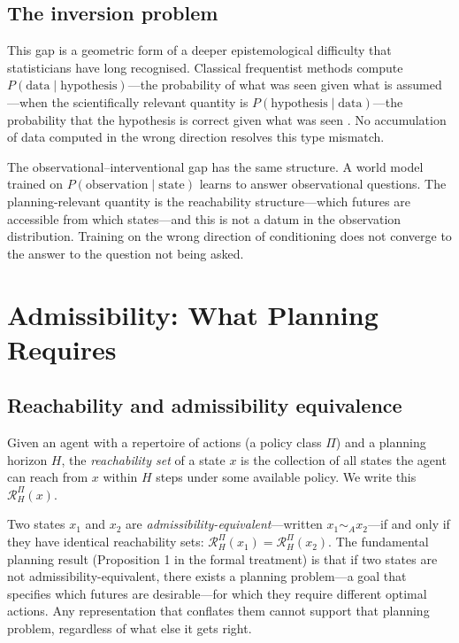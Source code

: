 \documentclass[11pt,a4paper]{article}
\newcommand{\simA}{\sim_{\!A}}
\begin{document}
\subsection{The inversion problem}

This gap is a geometric form of a deeper epistemological difficulty that
statisticians have long recognised. Classical frequentist methods compute
$P(\text{data} \mid \text{hypothesis})$---the probability of what was seen
given what is assumed---when the scientifically relevant quantity is
$P(\text{hypothesis} \mid \text{data})$---the probability that the hypothesis is
correct given what was seen \citep{jaynes2003probability}. No accumulation of
data computed in the wrong direction resolves this type mismatch.

The observational--interventional gap has the same structure. A world model
trained on $P(\text{observation} \mid \text{state})$ learns to answer
observational questions. The planning-relevant quantity is the reachability
structure---which futures are accessible from which states---and this is not
a datum in the observation distribution. Training on the wrong direction of
conditioning does not converge to the answer to the question not being asked.

\section{Admissibility: What Planning Requires}

\subsection{Reachability and admissibility equivalence}

Given an agent with a repertoire of actions (a policy class $\Pi$) and a
planning horizon $H$, the \emph{reachability set} of a state $x$ is the
collection of all states the agent can reach from $x$ within $H$ steps under
some available policy. We write this $\mathcal{R}_H^\Pi(x)$.

Two states $x_1$ and $x_2$ are \emph{admissibility-equivalent}---written
$x_1 \simA x_2$---if and only if they have identical reachability sets:
$\mathcal{R}_H^\Pi(x_1) = \mathcal{R}_H^\Pi(x_2)$. The fundamental planning
result (Proposition 1 in the formal treatment) is that if two states are not
admissibility-equivalent, there exists a planning problem---a goal that
specifies which futures are desirable---for which they require different
optimal actions. Any representation that conflates them cannot support that
planning problem, regardless of what else it gets right.
\end{document}
